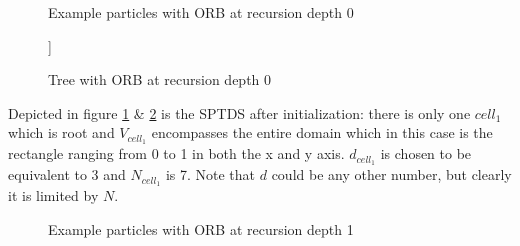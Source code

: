 \documentclass[]{article}
\begin{document}
\begin{figure}[H]
	
	\centering
	\caption{Example particles with ORB at recursion depth 0}
	\label{fig:orb1}
\end{figure}

\begin{figure}[H]
	\centering
	\begin{forest}
		[$cell_1$
		[]  
		]
	\end{forest}    
	\caption{Tree with ORB at recursion depth 0}
	\label{fig:orb11}
\end{figure}

Depicted in figure \ref{fig:orb1} \&  \ref{fig:orb11} is the SPTDS after initialization: there is only one $cell_1$ which is root and $V_{cell_1}$ encompasses the entire domain which in this case is the rectangle ranging from 0 to 1 in both the x and y axis. $d_{cell_1}$ is chosen to be equivalent to 3 and $N_{cell_1}$ is 7. Note that $d$ could be any other number, but clearly it is limited by $N$. 

\begin{figure}[H]
	\begin{center}
	\end{center}
	\caption{Example particles with ORB at recursion depth 1}
	\label{fig:orb2}
\end{figure}
\end{document}
